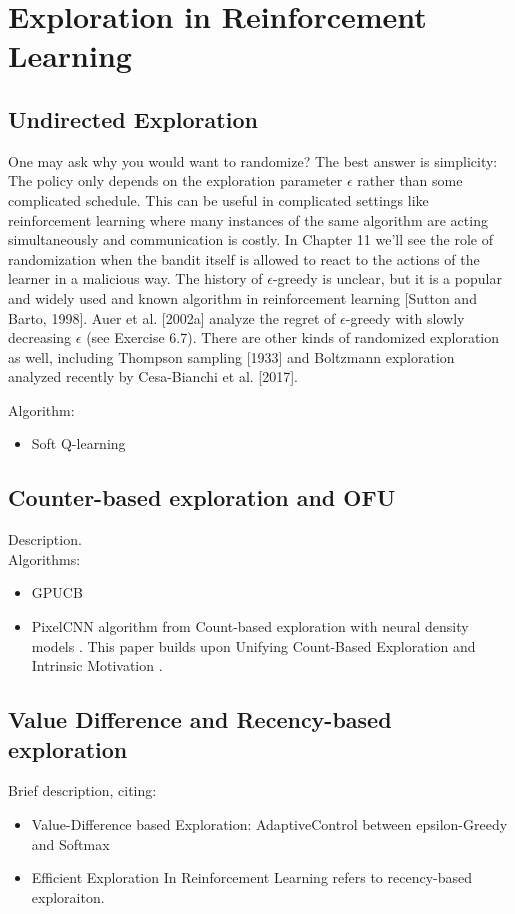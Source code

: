 \section{Exploration in Reinforcement Learning}

\subsection{Undirected Exploration}
One may ask why you would want to randomize? The
best answer is simplicity: The policy only depends on the exploration parameter
$\epsilon$ rather than some complicated schedule. This can be useful in complicated
settings like reinforcement learning where many instances of the same algorithm
are acting simultaneously and communication is costly. In Chapter 11 we’ll see
the role of randomization when the bandit itself is allowed to react to the actions
of the learner in a malicious way. The history of $\epsilon$-greedy is unclear, but it is a
popular and widely used and known algorithm in reinforcement learning [Sutton
and Barto, 1998]. Auer et al. [2002a] analyze the regret of $\epsilon$-greedy with slowly
decreasing $\epsilon$ (see Exercise 6.7). There are other kinds of randomized exploration
as well, including Thompson sampling [1933] and Boltzmann exploration analyzed
recently by Cesa-Bianchi et al. [2017].

Algorithm:
\begin{itemize}
\item Soft Q-learning \cite{haarnoja2017reinforcement}
\end{itemize}

\subsection{Counter-based exploration and OFU}
Description. \\
Algorithms:
\begin{itemize}
\item GPUCB \cite{srinivas2010gaussian}
\item  PixelCNN algorithm from Count-based exploration with neural density models \cite{ostrovski2017count}. This paper builds upon Unifying Count-Based Exploration and Intrinsic Motivation \cite{bellemare2016unifying}. %
\end{itemize}

\subsection{Value Difference and Recency-based exploration}
Brief description, citing:
\begin{itemize}
\item  Value-Difference based Exploration: AdaptiveControl between epsilon-Greedy and Softmax \cite{tokic2011value}
\item Efficient Exploration In Reinforcement Learning \cite{thrun1992efficient} refers to recency-based exploraiton.
\end{itemize}

